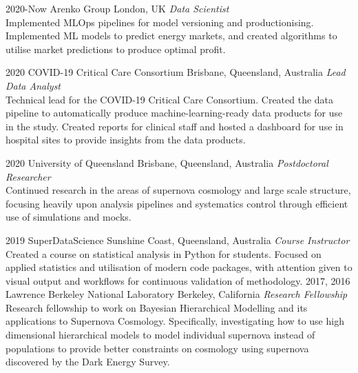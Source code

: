 \begin{entrylist}

\entry
{2020-Now}
{Arenko Group}
{London, UK}
{\emph{Data Scientist} \\
Implemented MLOps pipelines for model versioning and productionising. Implemented ML models to predict energy markets, and created algorithms to utilise market predictions to produce optimal profit.}


\entry
{2020}
{COVID-19 Critical Care Consortium}
{Brisbane, Queensland, Australia}
{\emph{Lead Data Analyst} \\
Technical lead for the COVID-19 Critical Care Consortium. Created the data pipeline to automatically produce machine-learning-ready data products for use in the study. Created reports for clinical staff and hosted a dashboard for use in hospital sites to provide insights from the data products.}


\entry
{2020}
{University of Queensland}
{Brisbane, Queensland, Australia}
{\emph{Postdoctoral Researcher} \\
Continued research in the areas of supernova cosmology and large scale structure, focusing heavily upon analysis pipelines and systematics control through efficient use of simulations and mocks.}

\entry
{2019}
{SuperDataScience}
{Sunshine Coast, Queensland, Australia}
{\emph{Course Instructor} \\
Created a course on statistical analysis in Python for students. Focused on applied statistics and utilisation of modern code packages, with attention given to visual output and workflows for continuous validation of methodology.}
\entry
{2017, 2016}
{Lawrence Berkeley National Laboratory}
{Berkeley, California}
{\emph{Research Fellowship} \\
	Research fellowship to work on Bayesian Hierarchical Modelling and its applications to Supernova Cosmology. Specifically, investigating how to use high dimensional hierarchical models to model individual supernova instead of populations to provide better constraints on cosmology using supernova discovered by the Dark Energy Survey.}
\end{entrylist}
